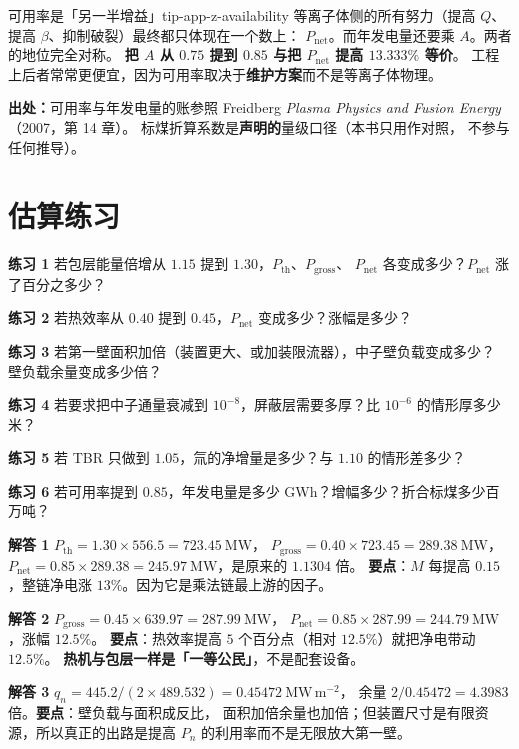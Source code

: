 \begin{tip}{可用率是「另一半增益」}{tip-app-z-availability}
等离子体侧的所有努力（提高 $Q$、提高 $\beta$、抑制破裂）最终都只体现在一个数上：
$P_{\mathrm{net}}$。而年发电量还要乘 $A$。两者的地位完全对称。
\textbf{把 $A$ 从 $0.75$ 提到 $0.85$ 与把 $P_{\mathrm{net}}$ 提高 $13.333\%$ 等价}。
工程上后者常常更便宜，因为可用率取决于\textbf{维护方案}而不是等离子体物理。
\end{tip}

{\footnotesize
\textbf{出处：}可用率与年发电量的账参照 Freidberg \emph{Plasma Physics and Fusion
Energy}（2007，第 14 章）。
标煤折算系数是\textbf{声明的}量级口径（本书只用作对照，
不参与任何推导）。
}

\section{估算练习}
\label{sec:app-z-problems}

\textbf{练习 1} 若包层能量倍增从 $1.15$ 提到 $1.30$，$P_{\mathrm{th}}$、$P_{\mathrm{gross}}$、
$P_{\mathrm{net}}$ 各变成多少？$P_{\mathrm{net}}$ 涨了百分之多少？

\textbf{练习 2} 若热效率从 $0.40$ 提到 $0.45$，$P_{\mathrm{net}}$ 变成多少？涨幅是多少？

\textbf{练习 3} 若第一壁面积加倍（装置更大、或加装限流器），中子壁负载变成多少？
壁负载余量变成多少倍？

\textbf{练习 4} 若要求把中子通量衰减到 $10^{-8}$，屏蔽层需要多厚？比 $10^{-6}$ 的情形厚多少米？

\textbf{练习 5} 若 TBR 只做到 $1.05$，氚的净增量是多少？与 $1.10$ 的情形差多少？

\textbf{练习 6} 若可用率提到 $0.85$，年发电量是多少 GWh？增幅多少？折合标煤多少百万吨？

\textbf{解答 1} $P_{\mathrm{th}} = 1.30\times556.5 = 723.45\ \mathrm{MW}$，
$P_{\mathrm{gross}} = 0.40\times723.45 = 289.38\ \mathrm{MW}$，
$P_{\mathrm{net}} = 0.85\times289.38 = 245.97\ \mathrm{MW}$，是原来的 $1.1304$ 倍。
\textbf{要点}：$M$ 每提高 $0.15$，整链净电涨 $13\%$。因为它是乘法链最上游的因子。

\textbf{解答 2} $P_{\mathrm{gross}} = 0.45\times639.97 = 287.99\ \mathrm{MW}$，
$P_{\mathrm{net}} = 0.85\times287.99 = 244.79\ \mathrm{MW}$，涨幅 $12.5\%$。
\textbf{要点}：热效率提高 $5$ 个百分点（相对 $12.5\%$）就把净电带动 $12.5\%$。
\textbf{热机与包层一样是「一等公民」}，不是配套设备。

\textbf{解答 3} $q_n = 445.2/(2\times489.532) = 0.45472\ \mathrm{MW\,m^{-2}}$，
余量 $2/0.45472 = 4.3983$ 倍。\textbf{要点}：壁负载与面积成反比，
面积加倍余量也加倍；但装置尺寸是有限资源，所以真正的出路是提高
$P_n$ 的利用率而不是无限放大第一壁。


